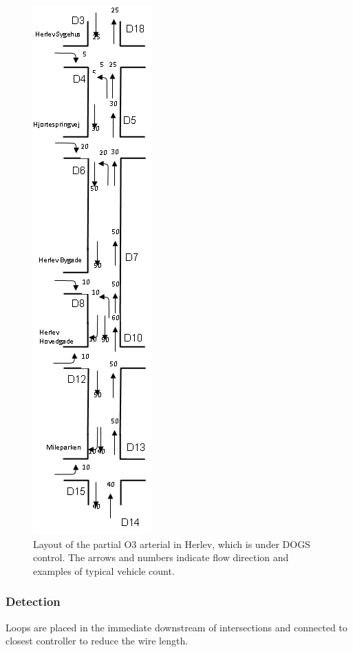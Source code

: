 \begin{figure}[!ht]
\begin{center}
\includegraphics[scale=0.5,angle=90]{dogs_herlev.png} 
\end{center}
\caption{Layout of the partial O3 arterial in Herlev, which is under DOGS control. The arrows and numbers indicate flow direction and examples of typical vehicle count.}
\label{fig:dogs_herlev}
\end{figure}

\subsubsection*{Detection}

Loops are placed in the immediate downstream of intersections and
connected to closest controller to reduce the wire length.

